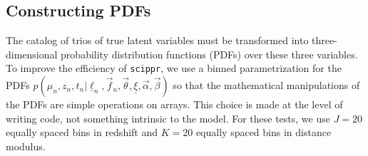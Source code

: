 \documentclass[12pt, onecolumn]{emulateapj}
\newcommand{\textul}{\underline}
\newcommand{\scippr}{\texttt{scippr}}
\begin{document}
%
%
%

\subsection{Constructing PDFs}
\label{sec:pdfs}

The catalog of trios of true latent variables must be transformed into three-dimensional probability distribution functions (PDFs) over these three variables.  To improve the efficiency of \scippr, we use a binned parametrization for the PDFs $p(\mu_{n}, z_{n}, t_{n} | \textul{\ell}_{n}, \vec{f}_{n}, \vec{\theta}, \textul{\xi}, \vec{\alpha}, \vec{\beta})$ so that the mathematical manipulations of the PDFs are simple operations on arrays.  This choice is made at the level of writing code, not something intrinsic to the model.  For these tests, we use $J=20$ equally spaced bins in redshift and $K=20$ equally spaced bins in distance modulus.  
\end{document}
